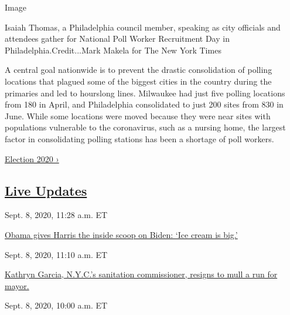 Image

Isaiah Thomas, a Philadelphia council member, speaking as city officials
and attendees gather for National Poll Worker Recruitment Day in
Philadelphia.Credit...Mark Makela for The New York Times

A central goal nationwide is to prevent the drastic consolidation of
polling locations that plagued some of the biggest cities in the country
during the primaries and led to hourslong lines. Milwaukee had just five
polling locations from 180 in April, and Philadelphia consolidated to
just 200 sites from 830 in June. While some locations were moved because
they were near sites with populations vulnerable to the coronavirus,
such as a nursing home, the largest factor in consolidating polling
stations has been a shortage of poll workers.

\href{https://www.nytimes3xbfgragh.onion/news-event/2020-election}{Election
2020 ›}

\hypertarget{live-updates}{%
\subsection{\texorpdfstring{\href{https://www.nytimes3xbfgragh.onion/live/2020/09/08/us/trump-vs-biden}{Live
Updates}}{Live Updates}}\label{live-updates}}

\href{https://www.nytimes3xbfgragh.onion/live/2020/09/08/us/trump-vs-biden\#obama-gives-harris-the-inside-scoop-on-biden-ice-cream-is-big}{}

Sept. 8, 2020, 11:28 a.m. ET

\href{https://www.nytimes3xbfgragh.onion/live/2020/09/08/us/trump-vs-biden\#obama-gives-harris-the-inside-scoop-on-biden-ice-cream-is-big}{Obama
gives Harris the inside scoop on Biden: `Ice cream is
big.'}\href{https://www.nytimes3xbfgragh.onion/live/2020/09/08/us/trump-vs-biden\#kathryn-garcia-nycs-sanitation-commissioner-resigns-to-mull-a-run-for-mayor}{}

Sept. 8, 2020, 11:10 a.m. ET

\href{https://www.nytimes3xbfgragh.onion/live/2020/09/08/us/trump-vs-biden\#kathryn-garcia-nycs-sanitation-commissioner-resigns-to-mull-a-run-for-mayor}{Kathryn
Garcia, N.Y.C.'s sanitation commissioner, resigns to mull a run for
mayor.}\href{https://www.nytimes3xbfgragh.onion/live/2020/09/08/us/trump-vs-biden\#a-top-house-democrat-calls-for-the-suspension-of-postmaster-general-louis-dejoy-over-campaign-finance-allegations}{}

Sept. 8, 2020, 10:00 a.m. ET


